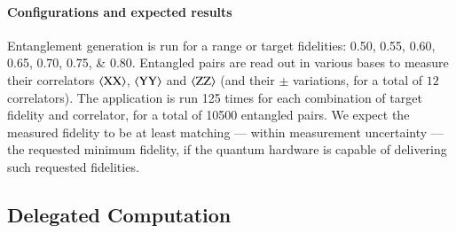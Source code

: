 \paragraph{Configurations and expected results}

Entanglement generation is run for a range or target fidelities: \numlist{0.50; 0.55; 0.60; 0.65;
0.70; 0.75; 0.80}. Entangled pairs are read out in various bases to measure their correlators
$\braket{\mathrm{XX}}$, $\braket{\mathrm{YY}}$ and $\braket{\mathrm{ZZ}}$ (and their $\pm$
variations, for a total of $12$ correlators). The application is run \num{125} times for each
combination of target fidelity and correlator, for a total of \num{10500} entangled pairs. We expect
the measured fidelity to be at least matching --- within measurement uncertainty --- the requested
minimum fidelity, if the quantum hardware is capable of delivering such requested fidelities.

%

\subsection{Delegated Computation}


